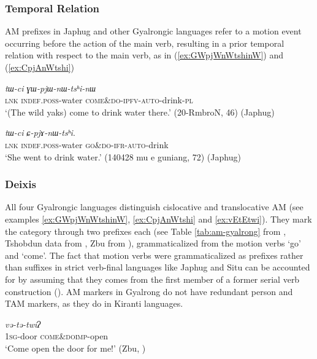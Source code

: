 \documentclass[oneside,a4paper,11pt]{article}
\newcommand{\ipa}[1]{{\phon\textit{#1}}}
\newcommand{\sens}[1]{‘#1’}
\newcommand{\rouge}[1]{{\color{red}#1}}
\begin{document}
 \subsubsection{Temporal Relation}
AM prefixes in Japhug and other Gyalrongic languages refer to a motion event occurring before the action of the main verb, resulting in a prior temporal relation with respect to the main verb, as in (\ref{ex:GWpjWnWtshinW}) and (\ref{ex:CpjAnWtshi})

\begin{exe}
\ex \label{ex:GWpjWnWtshinW}
\gll \ipa{tɕe}	\ipa{tɯ-ci}	\ipa{\rouge{ɣɯ}-pjɯ-nɯ-tsʰi-nɯ} \\
\textsc{lnk} \textsc{indef}.\textsc{poss}-water \rouge{\textsc{come\&do}}-\textsc{ipfv}-\textsc{auto}-drink-\textsc{pl} \\
\glt \sens{(The wild yaks) come to drink water there.} (20-RmbroN, 46) (Japhug)
\end{exe}

\begin{exe}
\ex \label{ex:CpjAnWtshi}
\gll \ipa{tɕe}	\ipa{tɯ-ci}	\ipa{\rouge{ɕ}-pjɤ-nɯ-tsʰi}. \\
\textsc{lnk} \textsc{indef}.\textsc{poss}-water \rouge{\textsc{go\&do}}-\textsc{ifr}-\textsc{auto}-drink  \\
\glt \sens{She went to drink water.} (140428 mu e guniang, 72) (Japhug)
\end{exe}

\subsubsection{Deixis}

All four Gyalrongic languages  distinguish cislocative and translocative AM (see examples \ref{ex:GWpjWnWtshinW}, \ref{ex:CpjAnWtshi} and \ref{ex:vEtEtwi}).  They mark the category through two prefixes each (see Table \ref{tab:am-gyalrong} from \citealt[200]{zhang16bragdbar}, Tshobdun data from \citealt{sun12complementation}, Zbu from \citealt{gong18these}), grammaticalized from the motion verbs `go' and `come'.  The fact that motion verbs were grammaticalized as prefixes rather than suffixes in strict verb-final languages like Japhug and Situ can be accounted for by assuming that they comes from the first member of a former serial verb construction (\citealt{jacques13harmonization}). AM markers in Gyalrong do not have redundant person and TAM markers, as they do in Kiranti languages. 

\begin{exe}
\ex \label{ex:vEtEtwi}
\gll  \ipa{ɐ-kómʔ}	\ipa{\rouge{və}-tə-twíʔ} \\
\textsc{1sg}-door  \rouge{\textsc{come\&do}}\textsc{imp}-open \\
\glt  \sens{Come open the door for me!} (Zbu, \citealt{gong18these})
\end{exe}
\end{document}
